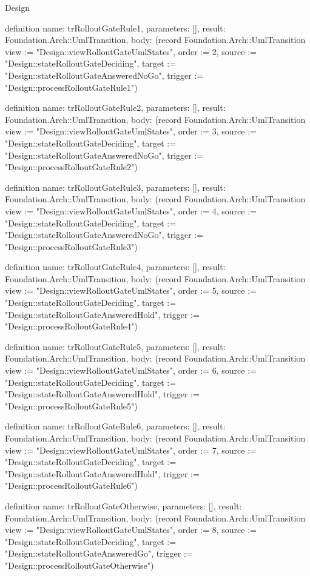 \begin{lexlean}{Design}
\begin{semanticmodule}
definition{
  name: trRolloutGateRule1,
  parameters: [],
  result: Foundation.Arch::UmlTransition,
  body: (record Foundation.Arch::UmlTransition {view := "Design::viewRolloutGateUmlStates", order := 2, source := "Design::stateRolloutGateDeciding", target := "Design::stateRolloutGateAnsweredNoGo", trigger := "Design::processRolloutGateRule1"})
}

definition{
  name: trRolloutGateRule2,
  parameters: [],
  result: Foundation.Arch::UmlTransition,
  body: (record Foundation.Arch::UmlTransition {view := "Design::viewRolloutGateUmlStates", order := 3, source := "Design::stateRolloutGateDeciding", target := "Design::stateRolloutGateAnsweredNoGo", trigger := "Design::processRolloutGateRule2"})
}

definition{
  name: trRolloutGateRule3,
  parameters: [],
  result: Foundation.Arch::UmlTransition,
  body: (record Foundation.Arch::UmlTransition {view := "Design::viewRolloutGateUmlStates", order := 4, source := "Design::stateRolloutGateDeciding", target := "Design::stateRolloutGateAnsweredNoGo", trigger := "Design::processRolloutGateRule3"})
}

definition{
  name: trRolloutGateRule4,
  parameters: [],
  result: Foundation.Arch::UmlTransition,
  body: (record Foundation.Arch::UmlTransition {view := "Design::viewRolloutGateUmlStates", order := 5, source := "Design::stateRolloutGateDeciding", target := "Design::stateRolloutGateAnsweredHold", trigger := "Design::processRolloutGateRule4"})
}

definition{
  name: trRolloutGateRule5,
  parameters: [],
  result: Foundation.Arch::UmlTransition,
  body: (record Foundation.Arch::UmlTransition {view := "Design::viewRolloutGateUmlStates", order := 6, source := "Design::stateRolloutGateDeciding", target := "Design::stateRolloutGateAnsweredHold", trigger := "Design::processRolloutGateRule5"})
}

definition{
  name: trRolloutGateRule6,
  parameters: [],
  result: Foundation.Arch::UmlTransition,
  body: (record Foundation.Arch::UmlTransition {view := "Design::viewRolloutGateUmlStates", order := 7, source := "Design::stateRolloutGateDeciding", target := "Design::stateRolloutGateAnsweredHold", trigger := "Design::processRolloutGateRule6"})
}

definition{
  name: trRolloutGateOtherwise,
  parameters: [],
  result: Foundation.Arch::UmlTransition,
  body: (record Foundation.Arch::UmlTransition {view := "Design::viewRolloutGateUmlStates", order := 8, source := "Design::stateRolloutGateDeciding", target := "Design::stateRolloutGateAnsweredGo", trigger := "Design::processRolloutGateOtherwise"})
}


\end{semanticmodule}
\end{lexlean}
